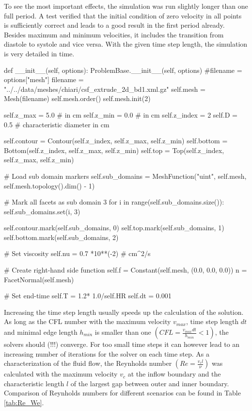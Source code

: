 To see the most important effects, the simulation was run slightly longer than one full period. A test verified that the initial condition of zero velocity in all points is sufficiently correct and leads to a good result in the first period already. Besides maximum and minimum velocities, it includes the transition from diastole to systole and vice versa.  With the given time step length, the simulation is very detailed in time.    
\begin{code}
def __init__(self, options):
	ProblemBase.__init__(self, options)
	#filename = options["mesh"]
	filename = "../../data/meshes/chiari/csf_extrude_2d_bd1.xml.gz"
	self.mesh = Mesh(filename)
	self.mesh.order()
	self.mesh.init(2)

	self.z_max = 5.0	# in cm
	self.z_min = 0.0	# in cm
	self.z_index = 2
	self.D = 0.5 		# characteristic diameter in cm

	self.contour = Contour(self.z_index, self.z_max, self.z_min)
	self.bottom = Bottom(self.z_index, self.z_max, self.z_min)
	self.top = Top(self.z_index, self.z_max, self.z_min)

    # Load sub domain markers
	self.sub_domains =  MeshFunction("uint", self.mesh, self.mesh.topology().dim() - 1)

	# Mark all facets as sub domain 3
	for i in range(self.sub_domains.size()):
		self.sub_domains.set(i, 3)

	self.contour.mark(self.sub_domains, 0)
	self.top.mark(self.sub_domains, 1)
	self.bottom.mark(self.sub_domains, 2)

    # Set viscosity 
	self.nu = 0.7 *10**(-2) # cm^2/s  

    # Create right-hand side function
	self.f = Constant(self.mesh, (0.0, 0.0, 0.0))
	n = FacetNormal(self.mesh)

    # Set end-time
	self.T = 1.2* 1.0/self.HR
	self.dt = 0.001
\end{code}


Increasing the time step length usually speeds up the calculation of the solution. As long as the CFL number with the maximum velocity $v_{max}$, time step length $dt$ and minimal edge length $h_{min}$ is smaller than one $(CFL = \frac{v_{max} dt}{h_{min}} < 1)$, the solvers should (!!!) converge. For too small time steps it can however lead to an increasing number of iterations for the solver on each time step.  As a characterization of the fluid flow, the Reynholds number $(Re = \frac{v_c l}{\nu})$ was calculated with the maximum velocity $v_c$ at the inflow boundary and the characteristic length $l$ of the largest gap between outer and inner boundary. Comparison of Reynholds numbers for different scenarios  can be found in Table \ref{tab:Re_We}. 


